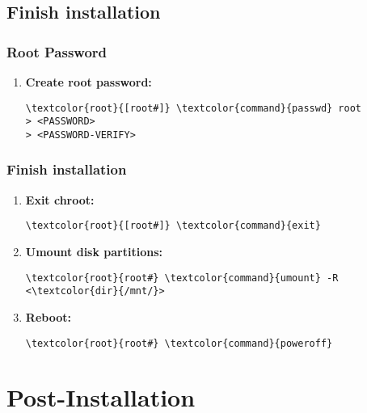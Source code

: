 \documentclass[10pt, a4paper, onecolumn, openany]{book} %
\begin{document}
\section{Finish installation}
\subsection{Root Password}
\begin{enumerate}
    \item \textbf{Create root password:}
\begin{Verbatim}[commandchars=\\\{\}]
\textcolor{root}{[root#]} \textcolor{command}{passwd} root
> <PASSWORD>
> <PASSWORD-VERIFY>
\end{Verbatim}
\end{enumerate}
\subsection{Finish installation}
\begin{enumerate}
    \item \textbf{Exit chroot:}
\begin{Verbatim}[commandchars=\\\{\}]
\textcolor{root}{[root#]} \textcolor{command}{exit}
\end{Verbatim}
    \item \textbf{Umount disk partitions:}
\begin{Verbatim}[commandchars=\\\{\}]
\textcolor{root}{root#} \textcolor{command}{umount} -R <\textcolor{dir}{/mnt/}>
\end{Verbatim}
    \item \textbf{Reboot:}
\begin{Verbatim}[commandchars=\\\{\}]
\textcolor{root}{root#} \textcolor{command}{poweroff}
\end{Verbatim}
\end{enumerate}
\chapter{Post-Installation}
\end{document}
